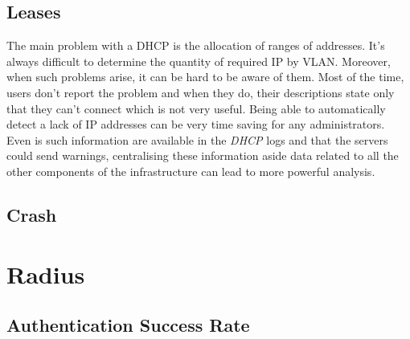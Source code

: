 \subsection{Leases}
The main problem with a DHCP is the allocation of ranges of addresses. It's always difficult to determine the quantity of required IP by VLAN. Moreover, when such problems arise, it can be hard to be aware of them. Most of the time, users don't report the problem and when they do, their descriptions state only that they can't connect which is not very useful. Being able to automatically detect a lack of IP addresses can be very time saving for any administrators. Even is such information are available in the \emph{DHCP} logs and that the servers could send warnings, centralising these information aside data related to all the other components of the infrastructure can lead to more powerful analysis. 

\subsection{Crash}


\section{Radius}


\subsection{Authentication Success Rate}





